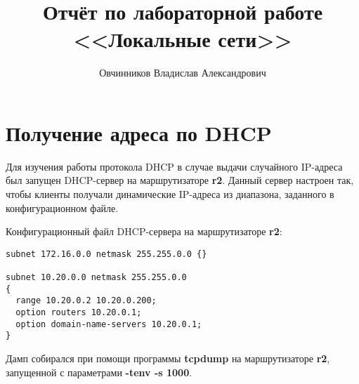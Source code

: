 \documentclass[a4paper,12pt]{article}
\title{Отчёт по лабораторной работе \\ <<Локальные сети>>}
\author{Овчинников Владислав Александрович}
\begin{document}
\maketitle

\tableofcontents


\section{Получение адреса по DHCP}

Для изучения работы протокола DHCP в случае выдачи случайного IP-адреса был запущен DHCP-сервер на маршрутизаторе \textbf{r2}. Данный сервер настроен так, чтобы клиенты получали динамические IP-адреса из диапазона, заданного в конфигурационном файле.

Конфигурационный файл DHCP-сервера на маршрутизаторе \textbf{r2}:
\begin{Verbatim}
subnet 172.16.0.0 netmask 255.255.0.0 {}

subnet 10.20.0.0 netmask 255.255.0.0
{
  range 10.20.0.2 10.20.0.200;
  option routers 10.20.0.1;
  option domain-name-servers 10.20.0.1;
}
\end{Verbatim}

Дамп собирался при помощи программы \textbf{tcpdump} на маршрутизаторе \textbf{r2}, запущенной с параметрами \textbf{-tenv -s 1000}.
\end{document}
